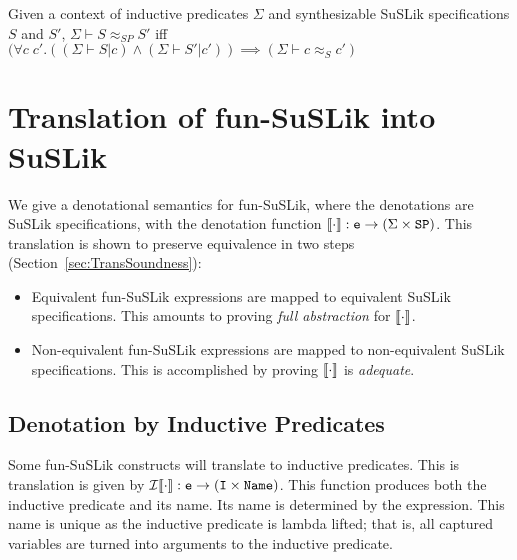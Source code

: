 \documentclass[10pt]{article}
\begin{document}
\begin{definition}
  Given a context of inductive predicates $\Sigma$ and synthesizable SuSLik specifications $S$ and $S'$, $\Sigma \vdash S \approx_{SP} S'$ iff
    $(\forall c\; c'. ((\Sigma \vdash S | c) \land (\Sigma \vdash S' | c')) \implies (\Sigma \vdash c \approx_{S} c')$
\end{definition}

\section{Translation of fun-SuSLik into SuSLik}
\label{sec:Translation}

We give a denotational semantics for fun-SuSLik, where the denotations are SuSLik specifications, with
the denotation function $\llbracket\cdot\rrbracket : \texttt{e} \rightarrow (\Sigma \times \texttt{SP})$.
This translation is shown to preserve equivalence in two steps (Section~\ref{sec:TransSoundness}):

\begin{itemize}
  \item Equivalent fun-SuSLik expressions are mapped to equivalent SuSLik specifications. This amounts to proving
    \textit{full abstraction} for $\llbracket\cdot\rrbracket$.
  \item Non-equivalent fun-SuSLik expressions are mapped to non-equivalent SuSLik specifications.
    This is accomplished by proving $\llbracket\cdot\rrbracket$ is \textit{adequate}.
\end{itemize}

\subsection{Denotation by Inductive Predicates}

Some fun-SuSLik constructs will translate to inductive predicates. This is translation is
given by $\mathcal{I}\llbracket\cdot\rrbracket : \texttt{e} \rightarrow (\texttt{I} \times \texttt{Name})$. This function produces both
the inductive predicate and its name. Its name is determined by the expression. This
name is unique as the inductive predicate is lambda lifted; that is, all captured variables
are turned into arguments to the inductive predicate.
\end{document}
